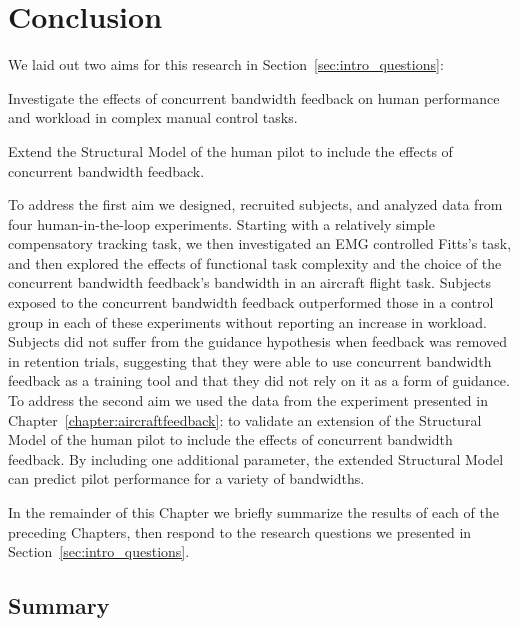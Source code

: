 \chapter{Conclusion}
\label{chap:conclusion}

We laid out two aims for this research in Section~\ref{sec:intro_questions}:
\begin{description}[align=left]
    \item [Aim One] Investigate the effects of concurrent bandwidth feedback on human performance and workload in complex manual control tasks.
    \item [Aim Two] Extend the Structural Model of the human pilot to include the effects of concurrent bandwidth feedback.
\end{description}

To address the first aim we designed, recruited subjects, and analyzed data from four human-in-the-loop experiments.
Starting with a relatively simple compensatory tracking task, we then investigated an EMG controlled Fitts's task, and then explored the effects of functional task complexity and the choice of the concurrent bandwidth feedback's bandwidth in an aircraft flight task.
Subjects exposed to the concurrent bandwidth feedback outperformed those in a control group in each of these experiments without reporting an increase in workload.
Subjects did not suffer from the guidance hypothesis when feedback was removed in retention trials, suggesting that they were able to use concurrent bandwidth feedback as a training tool and that they did not rely on it as a form of guidance.
To address the second aim we used the data from the experiment presented in Chapter~\ref{chapter:aircraftfeedback}:  to validate an extension of the Structural Model of the human pilot to include the effects of concurrent bandwidth feedback.
By including one additional parameter, the extended Structural Model can predict pilot performance for a variety of bandwidths.

In the remainder of this Chapter we briefly summarize the results of each of the preceding Chapters, then respond to the research questions we presented in Section~\ref{sec:intro_questions}.

\section{Summary}

